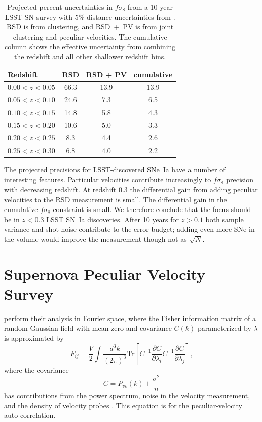 \documentclass{aastex62}   	%
\begin{document}
\begin{table}
   \centering
   \begin{tabular}{@{} lccc @{}} %
	\hline
	Redshift & RSD & RSD + PV & cumulative\\ \hline
      $0.00<z<0.05$   & 66.3 & 13.9 & 13.9\\
     $0.05<z<0.10$            & 24.6     &  7.3 & 6.5\\
     $0.10<z<0.15$      & 14.8  & 5.8 & 4.3\\
     $0.15<z<0.20$      & 10.6  & 5.0 & 3.3\\
      $0.20<z<0.25$     & 8.3  & 4.4 & 2.6\\
     $0.25<z<0.30$  & 6.8  &  4.0 & 2.2\\
      \hline
   \end{tabular}
   \caption{Projected percent uncertainties in $f\sigma_8$ from a 10-year LSST SN survey with 5\% distance uncertainties from
   \citet{2017ApJ...847..128H}. RSD is from clustering, and RSD~+~PV is from joint clustering and peculiar velocities.
   The cumulative column shows the effective uncertainty from combining the redshift and all other shallower redshift bins.}
   \label{tab:howlett}
\end{table}

The projected precisions for LSST-discovered SNe~Ia have a number of interesting features.  Particular velocities contribute increasingly to
$f\sigma_8$ precision with decreasing redshift.  At redshift 0.3 the differential gain from adding peculiar velocities to the RSD measurement is small.
The differential gain in the cumulative $f\sigma_8$ constraint is small.  We therefore conclude that the focus should be in $z<0.3$ LSST SN~Ia discoveries.
After 10 years for $z>0.1$ both sample variance and shot noise contribute to the error budget; adding even more SNe in the volume would improve
the measurement though not as $\sqrt{N}$.

\section{Supernova Peculiar Velocity Survey}
\citet{2017ApJ...847..128H} perform their analysis in Fourier space, 
where the Fisher information matrix of a random Gaussian field with mean zero and covariance $C(k)$ parameterized by $\lambda$ is
approximated by
\begin{equation}
F_{ij} = \frac{V}{2}\int \frac{d^3k}{(2\pi)^3} \text{Tr}\left[ C^{-1} \frac{\partial C}{\partial \lambda_i} C^{-1}
\frac{\partial C}{\partial \lambda_j} \right],
\end{equation}
where the covariance
\begin{equation}
C = P_{vv}(k) + \frac{\sigma^2}{n}
\end{equation}
has contributions from the power spectrum, noise in the velocity measurement, and the density of velocity probes
\citep{2017MNRAS.464.2517H}.   This equation is for the peculiar-velocity auto-correlation.
\end{document}
